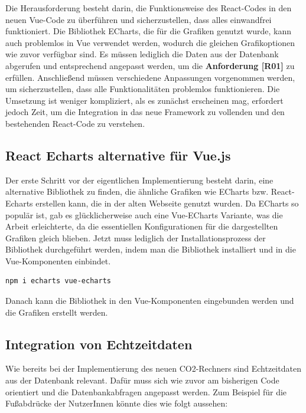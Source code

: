 Die Herausforderung besteht darin, die Funktionsweise des React-Codes in den neuen Vue-Code zu überführen und sicherzustellen, dass alles einwandfrei funktioniert. Die Bibliothek ECharts, die für die Grafiken genutzt wurde, kann auch problemlos in Vue verwendet werden, wodurch die gleichen Grafikoptionen wie zuvor verfügbar sind. Es müssen lediglich die Daten aus der Datenbank abgerufen und entsprechend angepasst werden, um die \textbf{Anforderung [R01]} zu erfüllen.
Anschließend müssen verschiedene Anpassungen vorgenommen werden, um sicherzustellen, dass alle Funktionalitäten problemlos funktionieren.
Die Umsetzung ist weniger kompliziert, als es zunächst erscheinen mag, erfordert jedoch Zeit, um die Integration in das neue Framework zu vollenden und den bestehenden React-Code zu verstehen.

\subsection{React Echarts alternative für Vue.js}

Der erste Schritt vor der eigentlichen Implementierung besteht darin, eine alternative Bibliothek zu finden, die ähnliche Grafiken wie ECharts bzw. React-Echarts erstellen kann, die in der alten Webseite genutzt wurden. Da ECharts so populär ist, gab es glücklicherweise auch eine Vue-ECharts Variante, was die Arbeit erleichterte, da die essentiellen Konfigurationen für die dargestellten Grafiken gleich blieben. Jetzt muss lediglich der Installationsprozess der Bibliothek durchgeführt werden, indem man die Bibliothek installiert und in die Vue-Komponenten einbindet.

\begin{lstlisting}[language={bash}, caption={Installation von Vue-ECharts}]
npm i echarts vue-echarts
\end{lstlisting}

Danach kann die Bibliothek in den Vue-Komponenten eingebunden werden und die Grafiken erstellt werden. \cite{vue-echarts}

\subsection{Integration von Echtzeitdaten}

Wie bereits bei der Implementierung des neuen CO2-Rechners sind Echtzeitdaten aus der Datenbank relevant. Dafür muss sich wie zuvor am bisherigen Code orientiert und die Datenbankabfragen angepasst werden. Zum Beispiel für die Fußabdrücke der NutzerInnen könnte dies wie folgt aussehen:

